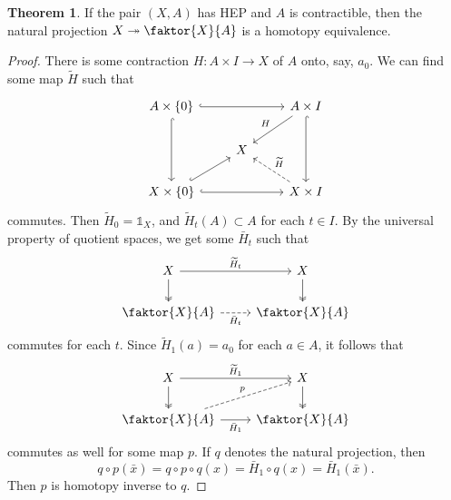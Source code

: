 \documentclass[10pt,letterpaper,cm]{nupset}
\theoremstyle{definition}
\theoremstyle{theorem}
\newtheorem{theorem}[definition]{Theorem}
\theoremstyle{remark}
\newcommand{\1}{\mathbb{1}}
\newcommand{\0}{\vec 0}
\begin{document}
\begin{theorem}
If the pair $\left(X, A\right)$ has HEP and $A$ is contractible, then the natural projection $X \twoheadrightarrow \faktor{X}{A}$ is a homotopy equivalence. 
\end{theorem}
\begin{proof}
There is some contraction $H: A \times I\to X$ of $A$ onto, say, $a_0$. We can find some map $\widetilde{H}$ such that 
\[
\begin{tikzcd}
A\times \left\{0\right\} \arrow[rr, hook] \arrow[dd, hook] &  & A\times I \arrow[dd, hook] \arrow[ld, "H"'] \\
 & X &  \\
X\times \left\{0\right\} \arrow[rr, hook] \arrow[ru, hook] &  & X\times I \arrow[lu, "\widetilde{H}"', dashed]
\end{tikzcd}
\] commutes. Then $\widetilde{H}_0 = \1_X$, and $\widetilde{H}_t(A) \subset A$ for each $t\in I$. By the universal property of quotient spaces, we get some $\bar{H}_t$ such that
\[
\begin{tikzcd}
X \arrow[d, two heads] \arrow[r, "\widetilde{H}_t"] & X \arrow[d, two heads] \\
\faktor{X}{A} \arrow[r, "\bar{H}_t"', dashed] & \faktor{X}{A}
\end{tikzcd}
\] commutes for each $t$. Since $\widetilde{H}_1(a) = a_0$ for each $a\in A$, it follows that 
\[
\begin{tikzcd}
X \arrow[d, two heads] \arrow[r, "\widetilde{H}_1"] & X \arrow[d, two heads] \\
\faktor{X}{A} \arrow[r, "\bar{H}_1"'] \arrow[ru, "p", dashed] & \faktor{X}{A}
\end{tikzcd}
\] commutes as well for some map $p$. If $q$ denotes the natural projection, then $$q\circ p(\bar{x}) = q \circ p \circ q({x}) = \bar{H}_1 \circ q({x}) = \bar{H}_1(\bar{x}).$$ Then $p$ is homotopy inverse to $q$.
\end{proof}
\end{document}
